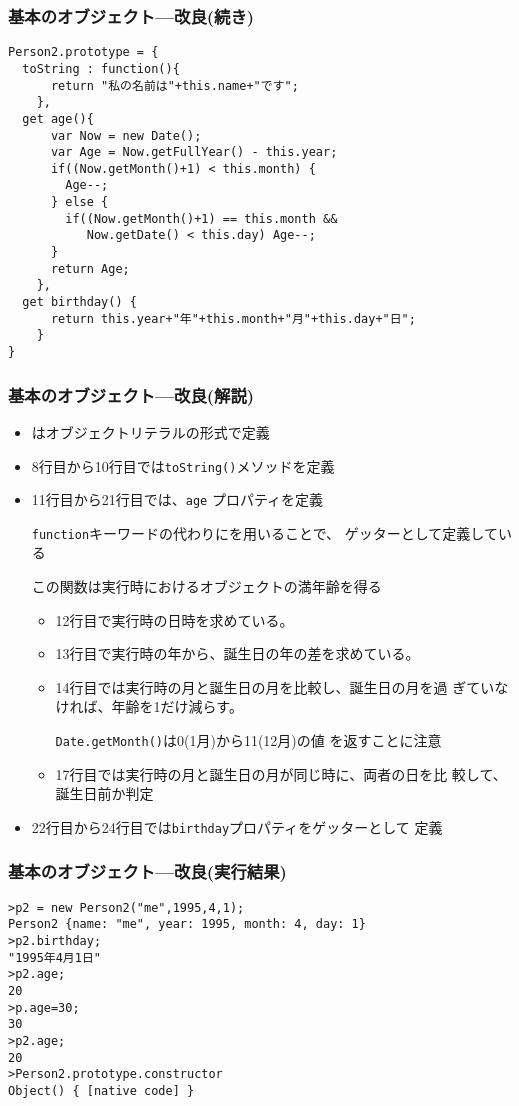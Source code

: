 \documentclass[dvipsk]{beamer}
\begin{document}
\begin{frame}[containsverbatim]
 \frametitle{基本のオブジェクト---改良(続き)}
 {\small
\begin{verbatim}
Person2.prototype = {
  toString : function(){
      return "私の名前は"+this.name+"です";
    },
  get age(){
      var Now = new Date();
      var Age = Now.getFullYear() - this.year;
      if((Now.getMonth()+1) < this.month) {
        Age--;
      } else {
        if((Now.getMonth()+1) == this.month &&
           Now.getDate() < this.day) Age--;
      }
      return Age;
    },
  get birthday() {
      return this.year+"年"+this.month+"月"+this.day+"日";
    }
}
\end{verbatim}
 }
 \end{frame}
\begin{frame}[containsverbatim]
 \frametitle{基本のオブジェクト---改良(解説)}
 \begin{itemize}
  \item {}はオブジェクトリテラルの形式で定義
  \item 8行目から10行目では\texttt{toString()}メソッドを定義
  \item 11行目から21行目では、\texttt{age} プロパティを定義
        
        \texttt{function}キーワードの代わりにを用いることで、
        ゲッターとして定義している

        この関数は実行時におけるオブジェクトの満年齢を得る
        \begin{itemize}
         \item 12行目で実行時の日時を求めている。
         \item 13行目で実行時の年から、誕生日の年の差を求めている。
         \item 14行目では実行時の月と誕生日の月を比較し、誕生日の月を過
               ぎていなければ、年齢を1だけ減らす。

               \texttt{Date.getMonth()}は0(1月)から11(12月)の値
               を返すことに注意
         \item 17行目では実行時の月と誕生日の月が同じ時に、両者の日を比
               較して、誕生日前か判定
        \end{itemize}
  \item 22行目から24行目では\texttt{birthday}プロパティをゲッターとして
        定義
 \end{itemize}
\end{frame}
\begin{frame}[containsverbatim]
 \frametitle{基本のオブジェクト---改良(実行結果)}
\begin{verbatim}
>p2 = new Person2("me",1995,4,1);
Person2 {name: "me", year: 1995, month: 4, day: 1}
>p2.birthday;
"1995年4月1日"
>p2.age;
20
>p.age=30;
30
>p2.age;
20
>Person2.prototype.constructor
Object() { [native code] }
\end{verbatim}
 \end{frame}
\end{document}
